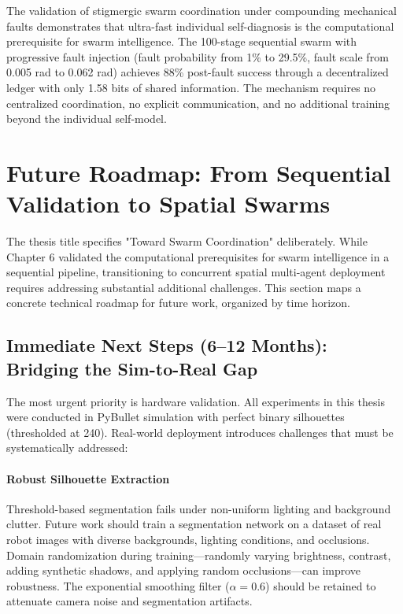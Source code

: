 ﻿\documentclass[12pt,a4paper,oneside]{report}
\begin{document}
The validation of stigmergic swarm coordination under compounding mechanical faults demonstrates that ultra-fast individual self-diagnosis is the computational prerequisite for swarm intelligence. The 100-stage sequential swarm with progressive fault injection (fault probability from 1\% to 29.5\%, fault scale from 0.005 rad to 0.062 rad) achieves 88\% post-fault success through a decentralized ledger with only 1.58 bits of shared information. The mechanism requires no centralized coordination, no explicit communication, and no additional training beyond the individual self-model.

\section{Future Roadmap: From Sequential Validation to Spatial Swarms}

The thesis title specifies "Toward Swarm Coordination" deliberately. While Chapter 6 validated the computational prerequisites for swarm intelligence in a sequential pipeline, transitioning to concurrent spatial multi-agent deployment requires addressing substantial additional challenges. This section maps a concrete technical roadmap for future work, organized by time horizon.

\subsection{Immediate Next Steps (6--12 Months): Bridging the Sim-to-Real Gap}

The most urgent priority is hardware validation. All experiments in this thesis were conducted in PyBullet simulation with perfect binary silhouettes (thresholded at 240). Real-world deployment introduces challenges that must be systematically addressed:

\paragraph{Robust Silhouette Extraction}
Threshold-based segmentation fails under non-uniform lighting and background clutter. Future work should train a segmentation network on a dataset of real robot images with diverse backgrounds, lighting conditions, and occlusions. Domain randomization during training---randomly varying brightness, contrast, adding synthetic shadows, and applying random occlusions---can improve robustness. The exponential smoothing filter ($\alpha = 0.6$) should be retained to attenuate camera noise and segmentation artifacts.
\end{document}
